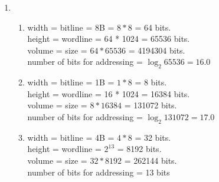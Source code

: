 \documentclass[12pt]{article}
\begin{document}
\begin{enumerate}
\begin{enumerate}
            \item
                $T_{access}=t_1+(1-h_1)(t_2+(1-h_2)(t_3+(1-h_3)(t_4+1-h_4(t_5))))=
                3*10^{-9}+0.08*(8*10^{-9}+0.15*(20*10^{-9})+0.3*10^{-9}*350+0.65*
                10^{-3}*12)=6.24*10^{-4}$
        \end{enumerate}
    \item
        \begin{enumerate}
            \item
                width = bitline = 8B = $8*8$ = 64 bits.\\
                height = wordline = 64 * 1024 = 65536 bits.\\
                volume = size = $64*65536$ = 4194304 bits.\\
                number of bits for addressing = $\log_2{65536}=16.0$
            \item
                width = bitline = 1B = $1*8$ = 8 bits.\\
                height = wordline = 16 * 1024 = 16384 bits.\\
                volume = size = $8*16384$ = 131072 bits.\\
                number of bits for addressing = $\log_2{131072}=17.0$
            \item
                width = bitline = 4B = $4*8$ = 32 bits.\\
                height = wordline = $2^{13}$ = 8192 bits.\\
                volume = size = $32*8192$ = 262144 bits.\\
                number of bits for addressing = 13 bits\\

        \end{enumerate}

\end{enumerate}
\end{document}
